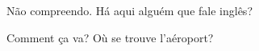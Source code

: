 \documentclass{article}
\begin{document}
N\~{a}o compreendo. H\'{a} aqui algu\'{e}m que fale ingl\^{e}s?

Comment \c{c}a va? O\`{u} se trouve l'a\'{e}roport?
\end{document}
